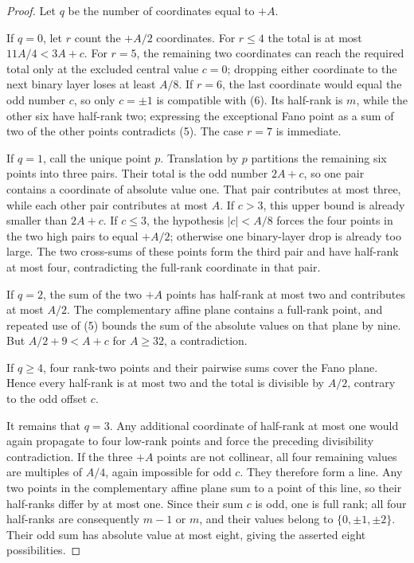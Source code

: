 \documentclass[11pt]{article}
\begin{document}
\begin{proof}


Let $q$ be the number of coordinates equal to $+A$.

If $q=0$, let $r$ count the $+A/2$ coordinates. For $r\leq4$ the total is at most
$11A/4<3A+c$. For $r=5$, the remaining two coordinates can reach the required total only at the
excluded central value $c=0$; dropping either coordinate to the next binary layer loses at least
$A/8$. If $r=6$, the last coordinate would equal the odd number $c$, so only $c=\pm1$ is
compatible with (6). Its half-rank is $m$, while the other six have half-rank two; expressing the
exceptional Fano point as a sum of two of the other points contradicts (5). The case $r=7$ is
immediate.

If $q=1$, call the unique point $p$. Translation by $p$ partitions the remaining six points into
three pairs. Their total is the odd number $2A+c$, so one pair contains a coordinate of absolute
value one. That pair contributes at most three, while each other pair contributes at most $A$.
If $c>3$, this upper bound is already smaller than $2A+c$. If $c\leq3$, the hypothesis
$|c|<A/8$ forces the four points in the two high pairs to equal $+A/2$;
otherwise one binary-layer drop is already too large. The two cross-sums of these points form the
third pair and have half-rank at most four, contradicting the full-rank coordinate in that pair.

If $q=2$, the sum of the two $+A$ points has half-rank at most two and contributes at most $A/2$.
The complementary affine plane contains a full-rank point, and repeated use of (5) bounds the sum
of the absolute values on that plane by nine. But $A/2+9<A+c$ for $A\geq32$, a contradiction.

If $q\geq4$, four rank-two points and their pairwise sums cover the Fano plane. Hence every
half-rank is at most two and the total is divisible by $A/2$, contrary to the odd offset $c$.

It remains that $q=3$. Any additional coordinate of half-rank at most one would again propagate
to four low-rank points and force the preceding divisibility contradiction. If the three $+A$
points are not collinear, all four remaining values are multiples of $A/4$, again impossible for
odd $c$. They therefore form a line. Any two points in the complementary affine plane sum to a
point of this line, so their half-ranks differ by at most one. Since their sum $c$ is odd, one is
full rank; all four half-ranks are consequently $m-1$ or $m$, and their values belong to
$\{0,\pm1,\pm2\}$. Their odd sum has absolute value at most eight, giving the asserted eight
possibilities.
\end{proof}
\end{document}
